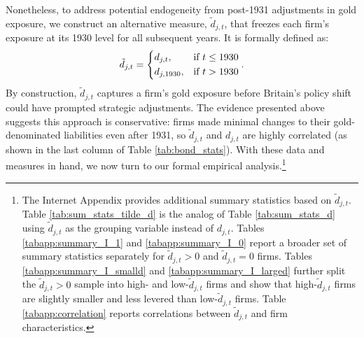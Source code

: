 Nonetheless, to address potential endogeneity from post-1931 adjustments in gold exposure, we construct an alternative measure, $\tilde{d}_{j,t}$, that freezes each firm's exposure at its 1930 level for all subsequent years. It is formally defined as:
\begin{equation}
\label{eq:tilde_d}
\tilde{d}_{j,t} = \begin{dcases}
d_{j,t}, & \text{if } t \leq 1930 \\
d_{j,1930}, & \text{if } t > 1930
\end{dcases}.
\end{equation}
By construction, $\tilde{d}_{j,t}$ captures a firm's gold exposure before Britain's policy shift could have prompted strategic adjustments. The evidence presented above suggests this approach is conservative: firms made minimal changes to their gold-denominated liabilities even after 1931, so $\tilde{d}_{j,t}$ and $d_{j,t}$ are highly correlated (as shown in the last column of Table \ref{tab:bond_stats}). With these data and measures in hand, we now turn to our formal empirical analysis.\footnote{The Internet Appendix provides additional summary statistics based on $\tilde{d}_{j,t}$. Table \ref{tab:sum_stats_tilde_d} is the analog of Table \ref{tab:sum_stats_d} using $\tilde{d}_{j,t}$ as the grouping variable instead of $d_{j,t}$. Tables \ref{tabapp:summary_I_1} and \ref{tabapp:summary_I_0} report a broader set of summary statistics separately for $\tilde{d}_{j,t} > 0$ and $\tilde{d}_{j,t} = 0$ firms. Tables \ref{tabapp:summary_I_smalld} and \ref{tabapp:summary_I_larged} further split the $\tilde{d}_{j,t} > 0$ sample into high- and low-$\tilde{d}_{j,t}$ firms and show that high-$\tilde{d}_{j,t}$ firms are slightly smaller and less levered than low-$\tilde{d}_{j,t}$ firms. Table \ref{tabapp:correlation} reports correlations between $\tilde{d}_{j,t}$ and firm characteristics.}
